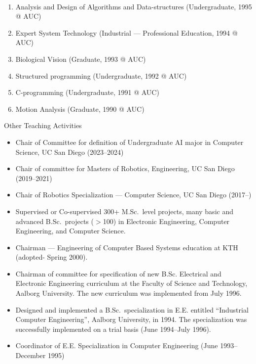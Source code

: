 \documentclass{article}
\begin{document}
\begin{cv}
\begin{cvlist}{~}
\begin{enumerate}
			\item Analysis and Design of Algorithms and Data-structures
			      (Undergraduate, 1995 @ AUC)
			\item Expert System Technology (Industrial --- Professional Education,
			      1994 @ AUC)
			\item Biological Vision (Graduate, 1993 @ AUC)
			\item Structured programming (Undergraduate, 1992 @ AUC)
			\item C-programming (Undergraduate, 1991 @ AUC)
			\item Motion Analysis (Graduate, 1990 @ AUC)
		\end{enumerate}

		\item[Other Teaching Activities]
		\begin{itemize}
			\item Chair of Committee for definition of Undergraduate AI major in Computer
			      Science, UC San Diego (2023--2024)

			\item Chair of committee for Masters of Robotics, Engineering,
			      UC San Diego (2019--2021)

			\item Chair of Robotics Specialization --- Computer Science, UC San
			      Diego (2017--)

			\item Supervised or Co-supervised 300+ M.Sc.\ level projects,
			      many basic and advanced B.Sc.\ projects ($>$100) in Electronic
			      Engineering, Computer Engineering, and Computer Science.

			\item Chairman --- Engineering of Computer Based Systems education at
			      KTH (adopted- Spring 2000).

			\item Chairman of committee for specification of new B.Sc. Electrical
			      and Electronic Engineering curriculum at the Faculty of Science and
			      Technology, Aalborg University.  The new curriculum was implemented
			      from July 1996.

			\item Designed and implemented a B.Sc.~specialization in E.E.
			      entitled ``Industrial Computer Engineering'', Aalborg University, in
			      1994.  The specialization was successfully implemented on a trial
			      basis (June 1994--July 1996).

			\item Coordinator of E.E. Specialization in Computer Engineering (June
			      1993--December 1995)
		\end{itemize}
	\end{cvlist}


\end{cv}
\end{document}
